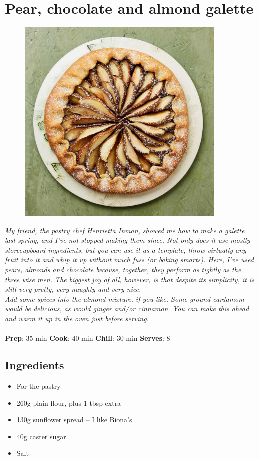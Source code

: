 \documentclass{book}
\begin{document}
\section{Pear, chocolate and almond galette}
\begin{figure}
\centering\includegraphics[width=10cm,height=10cm,keepaspectratio]{Recipe_Pictures/Pear,_chocolate_and_almond_galette.png}
\end{figure}
\emph{My friend, the pastry chef Henrietta Inman, showed me how to make a galette last spring, and I’ve not stopped making them since. Not only does it use mostly storecupboard ingredients, but you can use it as a template, throw virtually any fruit into it and whip it up without much fuss (or baking smarts). Here, I’ve used pears, almonds and chocolate because, together, they perform as tightly as the three wise men. The biggest joy of all, however, is that despite its simplicity, it is still very pretty, very naughty and very nice.\\ 
Add some spices into the almond mixture, if you like. Some ground cardamom would be delicious, as would ginger and/or cinnamon. You can make this ahead and warm it up in the oven just before serving.}\\\\ 
\textbf{Prep}: 35 min
\textbf{Cook}: 40 min
\textbf{Chill}: 30 min
\textbf{Serves}: 8
\subsection*{Ingredients}
\begin{itemize}
\item For the pastry
\item 260g plain flour, plus 1 tbsp extra
\item 130g sunflower spread – I like Biona’s
\item 40g caster sugar
\item Salt
\end{itemize}
\end{document}
